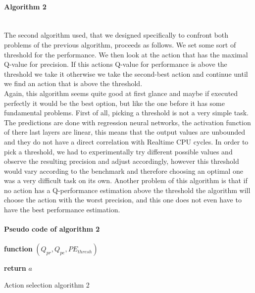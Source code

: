 \paragraph{Algorithm 2}\mbox{}\\
The second algorithm used, that we designed specifically to confront both problems of the previous algorithm, proceeds as follows. We set some sort of threshold for the performance. We then look at the action that has the maximal Q-value for precision. If this actions Q-value for performance is above the threshold we take it otherwise we take the second-best action and continue until we find an action that is above the threshold.\\
Again, this algorithm seems quite good at first glance and maybe if executed perfectly it would be the best option, but like the one before it has some fundamental problems. First of all, picking a threshold is not a very simple task. The predictions are done with regression neural networks, the activation function of there last layers are linear, this means that the output values are unbounded and they do not have a direct correlation with Realtime CPU cycles. In order to pick a threshold, we had to experimentally try different possible values and observe the resulting precision and adjust accordingly, however this threshold would vary according to the benchmark and therefore choosing an optimal one was a very difficult task on its own. Another problem of this algorithm is that if no action has a Q-performance estimation above the threshold the algorithm will choose the action with the worst precision, and this one does not even have to have the best performance estimation. 
\paragraph{Pseudo code of algorithm 2}
\begin{center}
	\begin{algorithm}[H]

    \textbf{function}  $(Q_{pr},Q_{pe},PE_{thresh})$\;
    
    
    \Indp{}\Indm
    \Indp{} \Indm
    \Indp
    
   
  
   \textbf{return} $a$
   
    
\caption{Action selection algorithm 2}
\end{algorithm}
\end{center}
